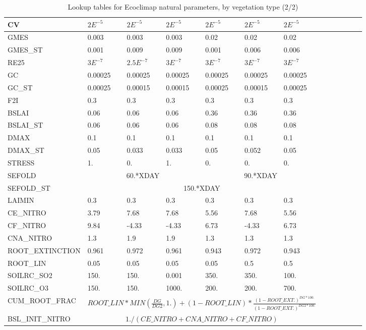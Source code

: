\begin{table}[htbp]
\begin{center}
\begin{tabular}{|l|l|l|l|l|l|l|l|l|l|l|l|l| }
\hline
CV & $2E^{-5}$ & $2E^{-5}$ & $2E^{-5}$ & $2E^{-5}$ & $2E^{-5}$ & $2E^{-5}$ \\
\hline
GMES & 0.003 & 0.003 & 0.003 & 0.02 & 0.02 & 0.02 \\
\hline
GMES\_ST & 0.001 & 0.009 & 0.009 & 0.001 & 0.006 & 0.006 \\
\hline
RE25 & $3E^{-7}$ & $2.5E^{-7}$ & $3E^{-7}$ & $3E^{-7}$ & $3E^{-7}$ & $3E^{-7}$ \\
\hline
GC & 0.00025 & 0.00025 & 0.00025 & 0.00025 & 0.00025 & 0.00025  \\
\hline
GC\_ST & 0.00025 & 0.00015 & 0.00015 & 0.00025 & 0.00015 & 0.00025 \\
\hline
F2I & 0.3 & 0.3 & 0.3 & 0.3 & 0.3 & 0.3 \\
\hline
BSLAI & 0.06 & 0.06 & 0.06 & 0.36 & 0.36 & 0.36\\ 
\hline
BSLAI\_ST & 0.06 & 0.06 & 0.06 & 0.08 & 0.08 & 0.08\\
\hline
DMAX & 0.1 & 0.1 & 0.1 & 0.1 & 0.1 & 0.1 \\
\hline
DMAX\_ST & 0.05 & 0.033 & 0.033 & 0.05 & 0.052 & 0.05 \\
\hline
STRESS & 1. & 0. & 1. & 0. & 0. & 0. \\
\hline
SEFOLD & \multicolumn{3}{|c|}{60.*XDAY} & \multicolumn{3}{|c|}{90.*XDAY} \\
\hline
SEFOLD\_ST & \multicolumn{6}{|c|}{150.*XDAY} \\
\hline
LAIMIN & 0.3 & 0.3 & 0.3 & 0.3 & 0.3 & 0.3 \\ 
\hline
CE\_NITRO & 3.79 & 7.68 & 7.68 & 5.56 & 7.68 & 5.56 \\
\hline
CF\_NITRO & 9.84 & -4.33 & -4.33 & 6.73 & -4.33 & 6.73 \\
\hline
CNA\_NITRO & 1.3 & 1.9 & 1.9 & 1.3 & 1.3 & 1.3  \\
\hline
ROOT\_EXTINCTION & 0.961 & 0.972 & 0.961 & 0.943 & 0.972 & 0.943 \\
\hline
ROOT\_LIN & 0.05 & 0.05 & 0.05 & 0.05 & 0.5 & 0.5 \\
\hline
SOILRC\_SO2 & 150. & 150. & 0.001 & 350. & 350. & 100.  \\
\hline
SOILRC\_O3 & 150. & 150. & 1000. & 200. & 200. & 700.  \\
\hline
CUM\_ROOT\_FRAC & \multicolumn{6}{|c|}{$ROOT\_LIN*MIN(\frac{DG}{DG2},1.)+(1-ROOT\_LIN)*\frac{(1-ROOT\_EXT.)^{DG*100.}}{(1-ROOT\_EXT.)^{DG2*100.}}$} \\
\hline
BSL\_INIT\_NITRO & \multicolumn{6}{|c|}{$1./(CE\_NITRO+CNA\_NITRO+CF\_NITRO)$} \\
\hline
\end{tabular}
\end{center}
\caption{Lookup tables for Ecoclimap natural parameters, by vegetation type (2/2)}
\label{tab4b}
\end{table}


